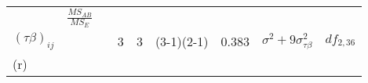 \documentclass[12pt,]{article}
\begin{document}
\begin{longtable}[]{@{}lllllllll@{}}
\begin{minipage}[t]{0.21\columnwidth}
\end{minipage} & \begin{minipage}[t]{0.09\columnwidth}\raggedright
\(\frac{MS_{AB}}{MS_{E}}\)\strut
\end{minipage}\tabularnewline
\begin{minipage}[t]{0.06\columnwidth}\raggedright
\((\tau\beta)_{ij}\)\strut
\end{minipage} & \begin{minipage}[t]{0.03\columnwidth}\raggedright
\strut
\end{minipage} & \begin{minipage}[t]{0.03\columnwidth}\raggedright
\strut
\end{minipage} & \begin{minipage}[t]{0.03\columnwidth}\raggedright
3\strut
\end{minipage} & \begin{minipage}[t]{0.03\columnwidth}\raggedright
3\strut
\end{minipage} & \begin{minipage}[t]{0.12\columnwidth}\raggedright
(3-1)(2-1)\strut
\end{minipage} & \begin{minipage}[t]{0.15\columnwidth}\raggedright
0.383\strut
\end{minipage} & \begin{minipage}[t]{0.21\columnwidth}\raggedright
\(\sigma^2+9\sigma^2_{\tau\beta}\)\strut
\end{minipage} & \begin{minipage}[t]{0.09\columnwidth}\raggedright
\(df_{2,36}\)\strut
\end{minipage}\tabularnewline
\begin{minipage}[t]{0.06\columnwidth}\raggedright
(r)\strut
\end{minipage} & \begin{minipage}[t]{0.03\columnwidth}\raggedright
\strut
\end{minipage} & \begin{minipage}[t]{0.03\columnwidth}\raggedright
\strut
\end{minipage} & \begin{minipage}[t]{0.03\columnwidth}\raggedright
\strut
\end{minipage} & \begin{minipage}[t]{0.03\columnwidth}\raggedright
\strut
\end{minipage} & \begin{minipage}[t]{0.12\columnwidth}\raggedright
\strut

\end{minipage}
\end{longtable}
\end{document}
